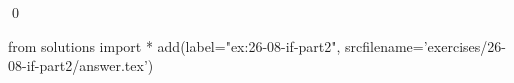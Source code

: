 
\begin{ex}
  \label{ex:26-08-if-part2}
  
  \qed
\end{ex}
\begin{python0}
from solutions import *
add(label="ex:26-08-if-part2",
    srcfilename='exercises/26-08-if-part2/answer.tex')
\end{python0}
